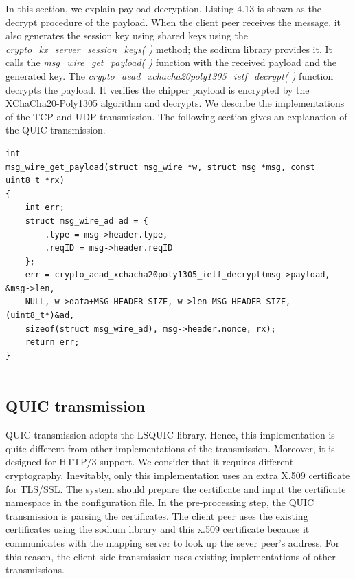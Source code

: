 In this section, we explain payload decryption. Listing 4.13 is shown as the decrypt procedure of the payload. When the client peer receives the message, it also generates the session key using shared keys using the \textit{crypto\_kx\_server\_session\_keys( )} method; the sodium library provides it. It calls the \textit{msg\_wire\_get\_payload( )} function with the received payload and the generated key. The \textit{crypto\_aead\_xchacha20poly1305\_ietf\_decrypt( )} function decrypts the payload. It verifies the chipper payload is encrypted by the XChaCha20-Poly1305 algorithm and decrypts. We describe the implementations of the TCP and UDP transmission. The following section gives an explanation of the QUIC transmission.

\lstset{language=C} 
\begin{lstlisting}[caption=The implementation of the payload decryption]
int
msg_wire_get_payload(struct msg_wire *w, struct msg *msg, const uint8_t *rx)
{
	int err;
	struct msg_wire_ad ad = {
		.type = msg->header.type,
		.reqID = msg->header.reqID
	};
	err = crypto_aead_xchacha20poly1305_ietf_decrypt(msg->payload, &msg->len,
	NULL, w->data+MSG_HEADER_SIZE, w->len-MSG_HEADER_SIZE, (uint8_t*)&ad,
	sizeof(struct msg_wire_ad), msg->header.nonce, rx);
	return err;
}
	
\end{lstlisting}

\subsection{QUIC transmission}

QUIC transmission adopts the LSQUIC library. Hence, this implementation is quite different from other implementations of the transmission. Moreover, it is designed for HTTP/3 support. We consider that it requires different cryptography. Inevitably, only this implementation uses an extra X.509 certificate for TLS/SSL. The system should prepare the certificate and input the certificate namespace in the configuration file. In the pre-processing step, the QUIC transmission is parsing the certificates. The client peer uses the existing certificates using the sodium library and this x.509 certificate because it communicates with the mapping server to look up the sever peer’s address. For this reason, the client-side transmission uses existing implementations of other transmissions.

